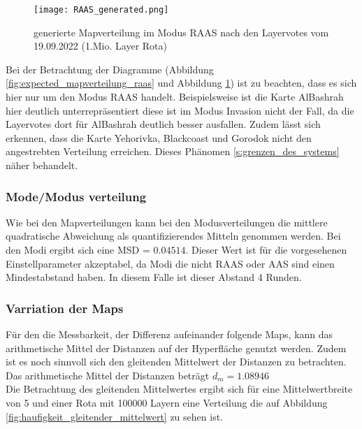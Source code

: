             \begin{figure}[h]
                \centering
                \texttt{[image: RAAS\_generated.png]}
                \caption{generierte Mapverteilung im Modus RAAS nach den Layervotes vom 19.09.2022 (1.Mio. Layer Rota)}
                \label{fig:generated_mapverteilung_raas}
            \end{figure}

            Bei der Betrachtung der Diagramme 
            (Abbildung \ref{fig:expected_mapverteilung_raas} und Abbildung \ref{fig:generated_mapverteilung_raas}) 
            ist zu beachten, dass es sich hier nur um den Modus RAAS handelt.
            Beispielsweise ist die Karte AlBashrah hier deutlich unterrepräsentiert diese ist im Modus Invasion
            nicht der Fall, da die Layervotes dort für AlBashrah deutlich besser ausfallen.
            Zudem lässt sich erkennen, dass die Karte Yehorivka, Blackcoast und Gorodok nicht den angestrebten
            Verteilung erreichen. Dieses Phänomen \ref{s:grenzen_des_systems} näher behandelt.

        \subsubsection{Mode/Modus verteilung}
            Wie bei den Mapverteilungen kann bei den Modusverteilungen die mittlere quadratische Abweichung als
            quantifizierendes Mitteln genommen werden. Bei den Modi ergibt sich eine MSD = $0.04514$.
            Dieser Wert ist für die vorgesehenen Einstellparameter akzeptabel, da Modi die nicht RAAS oder AAS sind
            einen Mindestabstand haben. In diesem Falle ist dieser Abstand 4 Runden.
        \subsubsection{Varriation der Maps}
            Für den die Messbarkeit, der Differenz aufeinander folgende Maps, kann das arithmetische Mittel der Distanzen
            auf der Hyperfläche genutzt werden. Zudem ist es noch sinnvoll sich den gleitenden Mittelwert der Distanzen
            zu betrachten.\\
            Das arithmetische Mittel der Distanzen beträgt $d_m = 1.08946$\\
            Die Betrachtung des gleitenden Mittelwertes ergibt sich für eine Mittelwertbreite von 5 und einer Rota mit 100000 Layern
            eine Verteilung die auf Abbildung \ref{fig:haufigkeit_gleitender_mittelwert} zu sehen ist.
            
